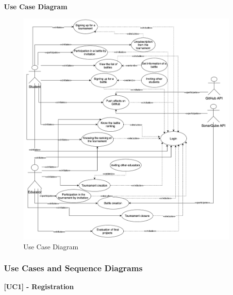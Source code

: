 \clearpage
\textbf{Use Case Diagram}
\begin{figure}[h]
    \centering
    \includegraphics[scale=0.55]{images/UseCaseDiagram/UseCaseDiagram.png} 
    \caption{Use Case Diagram}
    \label{fig_StudentUseCaseDiagram}
\end{figure}


\clearpage


\subsubsection{Use Cases and Sequence Diagrams}
\vspace{1\baselineskip}
\textbf{[UC1] - Registration}

